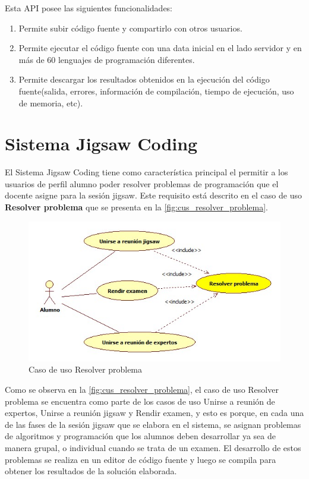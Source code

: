 \documentclass[twoside]{article}
\begin{document}
\begin{multicols}{2}
Esta API posee las siguientes funcionalidades:

\begin{enumerate}
	\item Permite subir código fuente y compartirlo con otros usuarios.
	\item Permite ejecutar el código fuente con una data inicial en el lado servidor y en más de 60 lenguajes de programación diferentes.
	\item Permite descargar los resultados obtenidos en la ejecución del código fuente(salida, errores, información de compilación, tiempo de ejecución, uso de memoria, etc).
\end{enumerate}

\section{Sistema Jigsaw Coding}

El Sistema Jigsaw Coding tiene como característica principal el permitir a los usuarios de perfil alumno poder resolver problemas de programación que el docente asigne para la sesión jigsaw. Este requisito está descrito en el caso de uso \textbf{Resolver problema} que se presenta en la \autoref{fig:cus_resolver_problema}. 

\begin{figure}[H]
	\centering	
	\includegraphics[scale=0.35]{figuras/casosdeuso/resolver_problema.jpg}
	\caption{Caso de uso Resolver problema}
	\label{fig:cus_resolver_problema}
\end{figure}

Como se observa en la \autoref{fig:cus_resolver_problema}, el caso de uso Resolver problema se encuentra como parte de los casos de uso Unirse a reunión de expertos, Unirse a reunión jigsaw y Rendir examen, y esto es porque, en cada una de las fases de la sesión jigsaw que se elabora en el sistema, se asignan problemas de algoritmos y programación que los alumnos deben desarrollar ya sea de manera grupal, o individual cuando se trata de un examen. El desarrollo de estos problemas se realiza en un editor de código fuente y luego se compila para obtener los resultados de la solución elaborada. 

\end{multicols}
\end{document}
